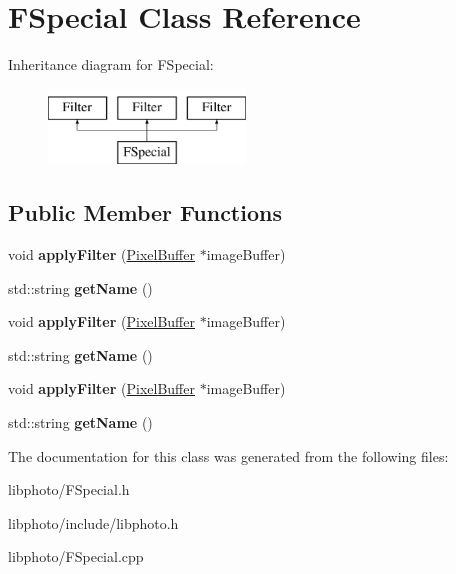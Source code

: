\hypertarget{classFSpecial}{\section{F\-Special Class Reference}
\label{classFSpecial}
}
Inheritance diagram for F\-Special\-:\begin{figure}[H]
\begin{center}
\leavevmode
\includegraphics[height=2.000000cm]{classFSpecial}
\end{center}
\end{figure}
\subsection*{Public Member Functions}
\begin{DoxyCompactItemize}
\item 
\hypertarget{classFSpecial_ad5af4242e35da376aeb628e6a7cabc5e}{void {\bfseries apply\-Filter} (\hyperlink{classPixelBuffer}{Pixel\-Buffer} $\ast$image\-Buffer)}\label{classFSpecial_ad5af4242e35da376aeb628e6a7cabc5e}

\item 
\hypertarget{classFSpecial_a769159ff4dc9f6ebd64a6bbe5ae2e917}{std\-::string {\bfseries get\-Name} ()}\label{classFSpecial_a769159ff4dc9f6ebd64a6bbe5ae2e917}

\item 
\hypertarget{classFSpecial_ad5af4242e35da376aeb628e6a7cabc5e}{void {\bfseries apply\-Filter} (\hyperlink{classPixelBuffer}{Pixel\-Buffer} $\ast$image\-Buffer)}\label{classFSpecial_ad5af4242e35da376aeb628e6a7cabc5e}

\item 
\hypertarget{classFSpecial_a769159ff4dc9f6ebd64a6bbe5ae2e917}{std\-::string {\bfseries get\-Name} ()}\label{classFSpecial_a769159ff4dc9f6ebd64a6bbe5ae2e917}

\item 
\hypertarget{classFSpecial_ad5af4242e35da376aeb628e6a7cabc5e}{void {\bfseries apply\-Filter} (\hyperlink{classPixelBuffer}{Pixel\-Buffer} $\ast$image\-Buffer)}\label{classFSpecial_ad5af4242e35da376aeb628e6a7cabc5e}

\item 
\hypertarget{classFSpecial_a769159ff4dc9f6ebd64a6bbe5ae2e917}{std\-::string {\bfseries get\-Name} ()}\label{classFSpecial_a769159ff4dc9f6ebd64a6bbe5ae2e917}

\end{DoxyCompactItemize}


The documentation for this class was generated from the following files\-:\begin{DoxyCompactItemize}
\item 
libphoto/F\-Special.\-h\item 
libphoto/include/libphoto.\-h\item 
libphoto/F\-Special.\-cpp\end{DoxyCompactItemize}
